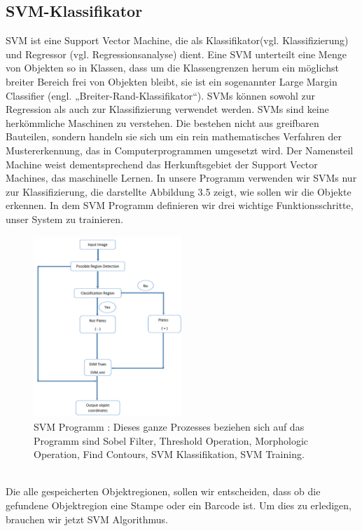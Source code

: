 \documentclass[10pt,a4paper]{report}
\begin{document}
\subsection{SVM-Klassifikator}
SVM ist eine Support Vector Machine, die als Klassifikator(vgl. Klassifizierung) und Regressor (vgl. Regressionsanalyse) dient. Eine SVM unterteilt eine Menge von Objekten so in Klassen, dass um die Klassengrenzen herum ein möglichst breiter Bereich frei von Objekten bleibt, sie ist ein sogenannter Large Margin Classifier (engl. „Breiter-Rand-Klassifikator“). SVMs können sowohl zur Regression als auch zur Klassifizierung verwendet werden\cite{4}.
SVMs sind keine herkömmliche Maschinen zu verstehen. Die bestehen  nicht aus greifbaren Bauteilen, sondern handeln sie sich um ein rein mathematisches Verfahren der Mustererkennung, das in Computerprogrammen umgesetzt wird. Der Namensteil Machine weist dementsprechend das Herkunftsgebiet der Support Vector Machines, das maschinelle Lernen.
In unsere Programm verwenden wir SVMs nur zur Klassifizierung, die darstellte Abbildung 3.5 zeigt, wie sollen wir die Objekte erkennen. In dem SVM Programm definieren wir drei wichtige Funktionsschritte, unser System zu trainieren.\\
\begin{figure}[htbp] 
	\centering
	\includegraphics[width=0.5\textwidth]{SVM.png}
	\caption{SVM Programm : Dieses ganze Prozesses beziehen sich auf das Programm sind Sobel Filter, Threshold Operation, Morphologic Operation, Find Contours, SVM Klassifikation, SVM Training.}
	\label{fig:Bild 5}
\end{figure}\\
Die alle gespeicherten Objektregionen, sollen wir entscheiden, dass ob die gefundene Objektregion eine Stampe oder ein Barcode ist. Um dies zu erledigen, brauchen wir jetzt SVM Algorithmus. 
\end{document}
